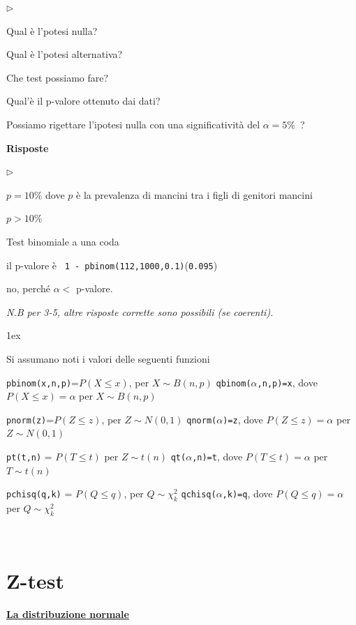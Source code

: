 \documentclass[12pt,openany]{book}
\newcommand{\mylabel}[1]{{\footnotesize\textsf{#1}}\hfill}
\renewenvironment{itemize}
  {\begin{list}{$\triangleright$}{%
   \setlength{\parskip}{0mm}
   \setlength{\topsep}{.2\baselineskip}
   \setlength{\rightmargin}{0mm}
   \setlength{\listparindent}{0mm}
   \setlength{\itemindent}{0mm}
   \setlength{\labelwidth}{3ex}
   \setlength{\itemsep}{.4\baselineskip}
   \setlength{\parsep}{0mm}
   \setlength{\partopsep}{0mm}
   \setlength{\labelsep}{1ex}
   \setlength{\leftmargin}{\labelwidth+\labelsep}
   \let\makelabel\mylabel}}{%
   \end{list}\vspace*{-1.3mm}}
\theoremstyle{mio}
\theoremstyle{liscio}
\begin{document}
\begin{itemize}
\item[1.] Qual è l'potesi nulla?

\item[2.] Qual è l'potesi alternativa?

\item[3.] Che test possiamo fare?

\item[4.] Qual'è il p-valore ottenuto dai dati?

\item[5.] Possiamo rigettare l'ipotesi nulla con una significatività del $\alpha=5\%$~?
\end{itemize}

\textbf{Risposte}

\begin{itemize}
\item[1.] $p=10\%$ dove $p$ è la prevalenza di mancini tra i figli di genitori mancini
\item[2.]  $p>10\%$ 
\item[3.] Test binomiale a una coda
\item[4.] il p-valore è \ {\tt 1 - pbinom(112,1000,0.1)}\hfill ({\tt 0.095})
\item[5.] no, perché $\alpha<$ p-valore.
\end{itemize}


\textit{N.B per 3-5, altre risposte corrette sono possibili (se coerenti).}

\parskip1ex
{\hrulefill\scriptsize

Si assumano noti i valori delle seguenti funzioni

{\tt pbinom(x,n,p)}=$P(X\le x)$, per $X\sim B(n,p)$
\hfill 
{\tt qbinom($\alpha$,n,p)=x},  dove $P(X\le x)=\alpha$ per $X\sim B(n,p)$

{\tt pnorm(z)}=$P(Z\le z)$, per $Z\sim N(0,1)$
\hfill 
{\tt qnorm($\alpha$)=z},  dove $P(Z\le z)=\alpha$ per $Z\sim N(0,1)$

{\tt pt(t,n)} = $P(T\le t)$ per $Z\sim t(n)$
\hfill
{\tt qt($\alpha$,n)=t}, dove $P(T\le t)=\alpha$ per $T\sim t(n)$

{\tt pchisq(q,k)} = $P(Q\le q)$, per $Q\sim \chi^2_k$
\hfill
{\tt qchisq($\alpha$,k)=q},  dove $P(Q\le q)=\alpha$ per $Q\sim \chi^2_k$
\par
}


\hfill{}\clearpage\
\section{Z-test}
\label{Z-test}
\hfill\textbf{{\color{brown}\hyperref[distribuzione normale]{La distribuzione normale \faShare}}}
\end{document}
